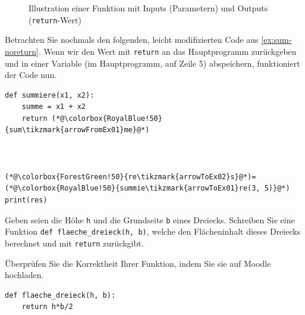 \begin{figure}[H]
\centering
{}
\caption{Illustration einer Funktion mit Inputs (Parametern) und Outputs (\lstinline|return|-Wert)}
\label{fig:funktion-einzeln}
\end{figure}

\begin{myexample}
Betrachten Sie nochmals den folgenden, leicht modifizierten Code aus \cref{ex:sum-noreturn}. Wenn wir den Wert mit \lstinline|return| an das Hauptprogramm zurückgeben und in einer Variable (im Hauptprogramm, auf Zeile 5) abspeichern, funktioniert der Code nun.\\

\begin{minipage}{\linewidth}
\begin{lstlisting}
def summiere(x1, x2):
    summe = x1 + x2
    return (*@\colorbox{RoyalBlue!50}{sum\tikzmark{arrowFromEx01}me}@*)
    


(*@\colorbox{ForestGreen!50}{re\tikzmark{arrowToEx02}s}@*)=(*@\colorbox{RoyalBlue!50}{summie\tikzmark{arrowToEx01}re(3, 5)}@*)
print(res)
\end{lstlisting}
\end{minipage}
\end{myexample}

\begin{mysubmission}
Geben seien die Höhe \texttt{h} und die Grundseite \texttt{b} eines Dreiecks. Schreiben Sie eine Funktion \lstinline|def flaeche_dreieck(h, b)|, welche den Flächeninhalt dieses Dreiecks berechnet und mit \lstinline|return| zurückgibt.

Überprüfen Sie die Korrektheit Ihrer Funktion, indem Sie sie auf Moodle hochladen.
\begin{myanswer}
\begin{lstlisting}
def flaeche_dreieck(h, b):
    return h*b/2
\end{lstlisting}
\end{myanswer}
\end{mysubmission}

